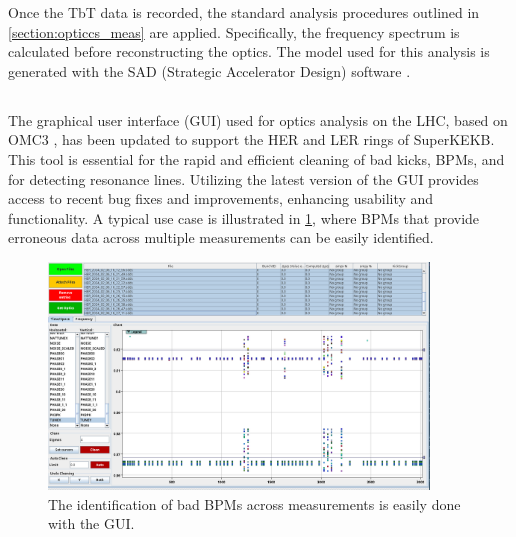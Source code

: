 Once the TbT data is recorded, the standard analysis procedures outlined in
\cref{section:opticcs_meas} are applied. Specifically, the frequency spectrum is calculated before
reconstructing the optics. The model used for this analysis is generated with the SAD (Strategic
Accelerator Design) software \cite{noauthor_sad_nodate}.


\subsection{}

The graphical user interface (GUI) used for optics analysis on the LHC, based on OMC3
\cite{omc-team_omc3_2021}, has been updated to support the HER and LER rings of SuperKEKB. This tool
is essential for the rapid and efficient cleaning of bad kicks, BPMs, and for detecting resonance
lines. Utilizing the latest version of the GUI provides access to recent bug fixes and improvements,
enhancing usability and functionality. A typical use case is illustrated in
\cref{fig:kek:gui_bad_bpms}, where BPMs that provide erroneous data across multiple measurements can
be easily identified.

\begin{figure}
    \centering
    \includegraphics[width=0.9\textwidth]{./images/kek/GUIbadbpm.png}
    \caption{The identification of bad BPMs across measurements is easily done with the GUI.}
    \label{fig:kek:gui_bad_bpms}
\end{figure}



\section{}

